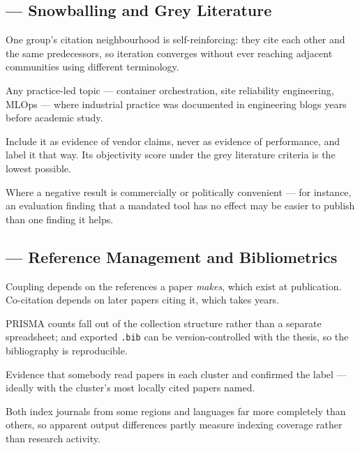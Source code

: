 \subsection*{ --- Snowballing and Grey Literature}
\begin{tightnum}
  \item One group's citation neighbourhood is self-reinforcing: they cite each
    other and the same predecessors, so iteration converges without ever
    reaching adjacent communities using different terminology.
  \item Any practice-led topic --- container orchestration, site reliability
    engineering, MLOps --- where industrial practice was documented in
    engineering blogs years before academic study.
  \item Include it as evidence of vendor claims, never as evidence of
    performance, and label it that way. Its objectivity score under the grey
    literature criteria is the lowest possible.
  \item Where a negative result is commercially or politically convenient ---
    for instance, an evaluation finding that a mandated tool has no effect may
    be easier to publish than one finding it helps.
\end{tightnum}

\subsection*{ --- Reference Management and Bibliometrics}
\begin{tightnum}
  \item Coupling depends on the references a paper \emph{makes}, which exist at
    publication. Co-citation depends on later papers citing it, which takes
    years.
  \item PRISMA counts fall out of the collection structure rather than a
    separate spreadsheet; and exported \texttt{.bib} can be version-controlled
    with the thesis, so the bibliography is reproducible.
  \item Evidence that somebody read papers in each cluster and confirmed the
    label --- ideally with the cluster's most locally cited papers named.
  \item Both index journals from some regions and languages far more completely
    than others, so apparent output differences partly measure indexing
    coverage rather than research activity.
\end{tightnum}


